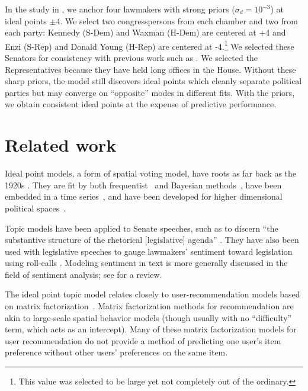 In the study in , we anchor four lawmakers with
strong priors ($\sigma_d = 10^{-3}$) at ideal points $\pm 4$.  We
select two congresspersons from each chamber and two from each party:
Kennedy (S-Dem) and Waxman (H-Dem) are centered at +4 and Enzi (S-Rep)
and Donald Young (H-Rep) are centered at -4.\footnote{This value was
selected to be large yet not completely out of the ordinary.} We
selected these Senators for consistency with previous
work such as \cite{clinton:2004}.  We selected the Representatives because
they have held long offices in the House.  Without these sharp priors,
the model still discovers ideal points which cleanly separate
political parties but may converge on ``opposite'' modes in different
fits.  With the priors, we obtain consistent ideal points at the
expense of predictive performance.

\section*{Related work}


Ideal point models, a form of spatial voting model, have roots as far
back as the 1920s \citep{enelow:1984}. They are fit by both
frequentist~\citep{poole:1985,heckman:1996} and Bayesian
methods~\citep{jackman:2001,martin:2002,clinton:2004}, have been
embedded in a time series~\citep{martin:2002,wang:2010}, and have been
developed for higher dimensional political
spaces~\citep{jackman:2001,heckman:1996}.

\nocite{johnson:1999ch6}

Topic models have been applied to Senate speeches, such as to discern
``the substantive structure of the rhetorical [legislative] agenda''
\citep{quinn:2006}.  They have also been used with legislative speeches
to gauge lawmakers' sentiment toward legislation using roll-calls
\citep{thomas:2006}.  Modeling sentiment in text is more generally
discussed in the field of sentiment analysis; see \cite{pang:2008} for a review.


The ideal point topic model relates closely to user-recommendation
models based on matrix factorization~\citep{salakhutdinov:2008a}.
Matrix factorization methods for recommendation are akin to
large-scale spatial behavior models (though usually with no
``difficulty'' term, which acts as an intercept).  Many of these
matrix factorization models for user recommendation do not provide a
method of predicting one user's item preference without other users'
preferences on the same item.


